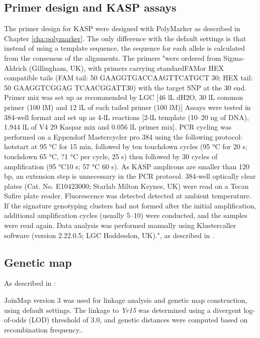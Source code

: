 \subsection{Primer design and KASP assays}
The primer design for KASP were designed with PolyMarker as described in Chapter \ref{cha:polymarker}. 
The only difference with the default settings is that instead of using a template sequence, the sequence for each allele is calculated from the consensus of the alignments. 
The primers "were ordered from Sigma-Aldrich (Gillingham, UK), with primers carrying standardFAMor HEX compatible tails (FAM tail: 50 GAAGGTGACCAAGTTCATGCT 30; HEX tail: 50 GAAGGTCGGAG TCAACGGATT30) with the target SNP at the 30 end. 
Primer mix was set up as recommended by LGC [46 lL dH2O, 30 lL common primer (100 lM) and 12 lL of each tailed primer (100 lM)] \citep{LGC}
Assays were tested in 384-well format and set up as 4-lL reactions [2-lL template (10–20 ng of DNA), 1.944 lL of V4 29 Kaspar mix and 0.056 lL primer mix]. 
PCR cycling was performed on a Eppendorf Mastercycler pro 384 using the following protocol: hotstart at 95 °C for 15 min, followed by ten touchdown cycles (95 °C for 20 s; touchdown 65 °C, ?1 °C per cycle, 25 s) then followed by 30 cycles of amplification (95 °C10 s; 57 °C 60 s). 
As KASP amplicons are smaller than 120 bp, an extension step is unnecessary in the PCR protocol. 384-well optically clear plates (Cat. No. E10423000; Starlab Milton Keynes, UK) were read on a Tecan Safire plate reader. 
Fluorescence was detected detected at ambient temperature. If the signature genotyping clusters had not formed after the initial amplification, additional amplification cycles (usually 5–10) were conducted, and the samples were read again. Data analysis was performed manually using Klustercaller software (version 2.22.0.5; LGC Hoddesdon, UK).", as described in \citet{Ramirez-Gonzalez2015b}.


\subsection{Genetic map}
As described in \citet{Ramirez-Gonzalez2015b}:
\begin{blockquote}
 JoinMap version 3 \citep{vanOoijen2002} was used for linkage analysis and genetic map construction, using default settings. The linkage to \textit{Yr15} was determined using a divergent log-of-odds (LOD) threshold of 3.0, and genetic distances were computed based on recombination frequency.. 
\end{blockquote}

